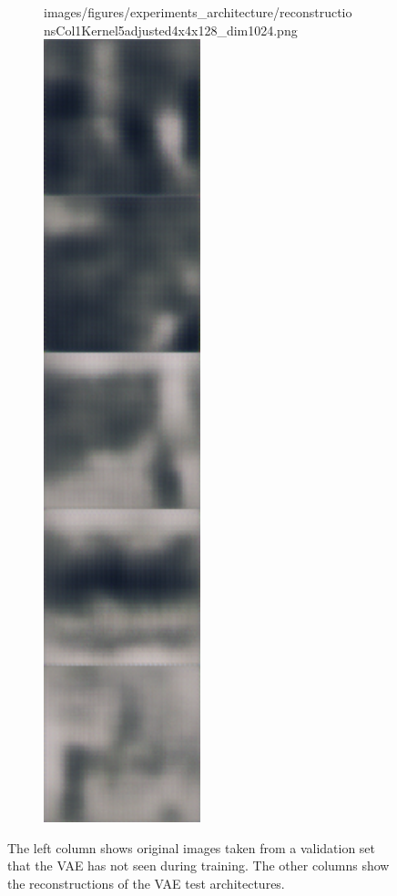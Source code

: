 \begin{figure}[H]
\begin{subfigure}[t]{.19\textwidth}
        {images/figures/experiments_architecture/reconstructionsCol1Kernel5adjusted4x4x128_dim1024.png}\hfill
        \includegraphics[width=0.5\textwidth]
        {images/figures/experiments_architecture/reconstructionsCol2Kernel5adjusted4x4x128_dim1024.png}
        \caption{}
    \end{subfigure}    
    \caption{The left column shows original images taken from a validation set that the VAE has not seen during
    training. The other columns show the reconstructions of the VAE test architectures.}
\end{figure}


